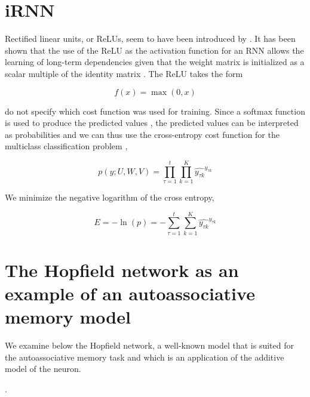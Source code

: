 \section{iRNN}

Rectified linear units, or ReLUs, seem to have been introduced by \citealt{hahnloser2000digital}. It has been shown that the use of the ReLU as the activation function for an RNN allows the learning of long-term dependencies given that the weight matrix is initialized as a scalar multiple of the identity matrix \cite[p. 2]{DBLP:journals/corr/LeJH15}. The ReLU takes the form

\begin{equation*}
f(x) = \max(0, x)
\end{equation*}

\citealt{DBLP:conf/nips/BaHMLI16} do not specify which cost function was used for training. Since a softmax function is used to produce the predicted values \cite[p. 5]{DBLP:conf/nips/BaHMLI16}, the predicted values can be interpreted as probabilities and we can thus use the cross-entropy cost function for the multiclass classification problem \cite{bishop2006pattern},

\begin{equation*}
p(y; U, W, V) = \prod_{\tau=1}^{t}\prod_{k=1}^{K}\widehat{y_{\tau k}}^{y_{\tau k}}
\end{equation*}

We minimize the negative logarithm of the cross entropy,

\begin{equation*}
E = -\ln(p) = -\sum_{\tau=1}^t \sum_{k=1}^K \widehat{y_{\tau k}}^{y_{\tau k}}
\end{equation*}

\section{The Hopfield network as an example of an autoassociative memory model}

We examine below the Hopfield network, a well-known model that is suited for the autoassociative memory task and which is an application of the additive model of the neuron.

\cite{Yegnanarayana:2004:ANN:1197006}.


